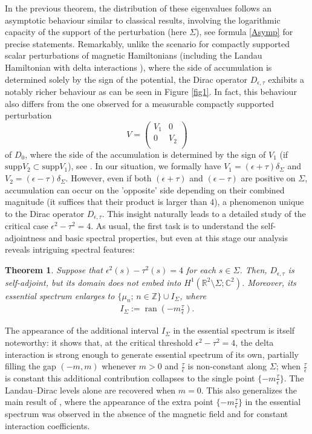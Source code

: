 \documentclass[11pt,a4paper,reqno,oneside]{amsproc}
\DeclareMathOperator{\ran}{ran}
\def \rr {{\mathbb R}}
\def \cc {{\mathbb C}}
\def \zz {{\mathbb Z}}
\numberwithin{equation}{section}
\def \cc {{\mathbb{C}}}
\newtheorem{theorem}[definition]{Theorem}
\begin{document}
In the previous theorem, the distribution of these eigenvalues follows an asymptotic behaviour similar to classical results, involving the logarithmic capacity of the support of the perturbation (here $\Sigma$), see formula \eqref{Asymp} for precise statements.  Remarkably, unlike the scenario for compactly supported scalar perturbations of magnetic Hamiltonians  \cite{FiPu06, MeRo07, GoKaPe16, BrRa20} (including the Landau Hamiltonian with delta interactions \cite{BEHL20}), where the side of accumulation is determined solely by the sign of the potential, the Dirac operator $D_{\epsilon, \tau}$ exhibits a notably richer behaviour as can be seen in Figure \ref{fig1}.  In fact, this behaviour also differs from the one observed for a measurable compactly supported perturbation 
\[
V= \begin{pmatrix}
V_1 & 0\\                                              
0 & V_2 \\                                            
\end{pmatrix}
\]
 of $D_0$, where the side of the accumulation is determined by the sign of $V_1$ (if $\text{supp} V_2 \subset \text{supp} V_1$), see \cite{BM}.  In our situation, we formally have $V_1= (\epsilon  + \tau )\delta_\Sigma$ and $V_2= (\epsilon - \tau )\delta_\Sigma$. However, even if both $(\epsilon + \tau )$ and $(\epsilon - \tau )$ are positive on $\Sigma$, accumulation can occur on the 'opposite' side depending on their combined magnitude (it suffices that their product is larger than $4$), a phenomenon unique to the Dirac operator $D_{\epsilon, \tau}$. This insight naturally leads to a detailed study of the critical case $\epsilon^2-\tau^2=4$. As usual, the first task is to understand the self-adjointness and basic spectral properties, but even at this stage our analysis reveals intriguing spectral features:

\begin{theorem} Suppose that $\epsilon^2(s)-\tau^2(s)=4$  for each $s\in \Sigma$. Then,  $D_{\epsilon,\tau}$ is self-adjoint, but its domain does not embed into  $H^1(\rr^2\setminus\Sigma;\cc^2)$. Moreover, its essential spectrum enlarges to  $\{ \mu_n; \, n \in  \zz \}\cup  I_\Sigma$, where 
\begin{align*}
I_\Sigma:=  \ran\left(-m\frac{\tau}{\epsilon}\right).
\end{align*}
\end{theorem}

The appearance of the additional interval $I_\Sigma$ in the essential spectrum is itself noteworthy:  it shows that, at the critical threshold $\epsilon^2-\tau^2=4$, the delta interaction is strong enough to generate essential spectrum of its own, partially filling the gap $(-m,m)$ whenever $m>0$ and $\frac{\tau}{\epsilon}$ is non-constant along $\Sigma$; when $\frac{\tau}{\epsilon}$ is constant this additional contribution collapses to the single point $\{-m\frac{\tau}{\epsilon}\}$.  The Landau--Dirac levels alone are recovered when $m=0$.  This also generalizes the main result of \cite{BHOP20}, where the appearance of the extra point $\{-m\frac{\tau}{\epsilon}\}$ in the essential spectrum was observed in the absence of the magnetic field and for constant interaction coefficients.
\end{document}
